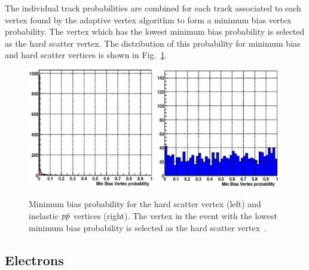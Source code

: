 The individual track probabilities are combined for each track associated to each vertex found by the adaptive vertex algorithm to form a minimum bias vertex probability. The vertex which has the lowest minimum bias probability is selected as the hard scatter vertex. The distribution of this probability for minimum bias and hard scatter vertices is shown in Fig.~\ref{minimum bias}.

\begin{figure}[!h!tbp]
\begin{center}
\includegraphics[width=0.49\textwidth]{eps/Reco/MBP_PV.eps}
\includegraphics[width=0.49\textwidth]{eps/Reco/MBP_MB.eps}
\end{center}
\vspace{-0.1in}
\caption{Minimum bias probability for the hard scatter vertex (left) and inelastic $\mbox{$p\bar{p}$}$ vertices (right). The vertex in the event with the lowest minimum bias probability is selected as the hard scatter vertex~\cite{pv}.}
\label{minimum bias}
\end{figure}


\subsection{Electrons}
\label{electronreco}

